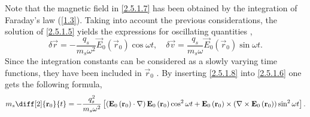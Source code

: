 Note that the magnetic field in \ref{2.5.1.7} has been obtained by the integration of Faraday's law (\ref{1.3}). Taking into account the previous considerations, the solution of \ref{2.5.1.5} yields the expressions for oscillating quantities \cite{eliezer},
\begin{equation}
\label{2.5.1.8}
\delta \vec{r} = -\frac{q_s}{m_s \omega^2} \vec{E}_0 \left(\vec{r}_0 \right) \cos \omega t, \quad \delta \vec{v} = \frac{q_s}{m_s \omega} \vec{E}_0 \left(\vec{r}_0 \right) \sin \omega t.
\end{equation}
Since the integration constants can be considered as a slowly varying time functions, they have been included in $ \vec{r}_0 $ \cite{Schmidt1966}. By inserting \ref{2.5.1.8} into \ref{2.5.1.6} one gets the following formula,
\begin{equation}
\label{2.5.1.9}
m_s \diff[2]{\vec{r}_0}{t} = - \frac{q_s^{2}}{m_s \omega^2} \left[\left(\vec{E}_0 \left(\vec{r}_0 \right) \cdot \nabla \right) \vec{E}_0 \left(\vec{r}_0 \right) \cos^2 \omega t + \vec{E}_0 \left(\vec{r}_0 \right) \times \left( \nabla \times \vec{E}_0 \left(\vec{r}_0 \right) \right) \sin^2 \omega t \right].
\end{equation}

